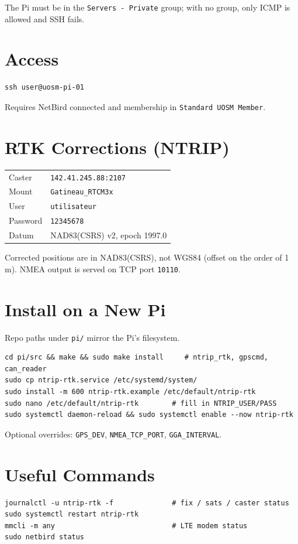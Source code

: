 \documentclass{article}
\begin{document}
\medskip
The Pi must be in the \texttt{Servers - Private} group; with no group, only ICMP is allowed and SSH fails.

\section{Access}
\begin{verbatim}
ssh user@uosm-pi-01
\end{verbatim}
Requires NetBird connected and membership in \texttt{Standard UOSM Member}.

\section{RTK Corrections (NTRIP)}
\begin{tabular}{@{}ll@{}}
\toprule
Caster    & \texttt{142.41.245.88:2107} \\
Mount     & \texttt{Gatineau\_RTCM3x} \\
User      & \texttt{utilisateur} \\
Password  & \texttt{12345678} \\
Datum     & NAD83(CSRS) v2, epoch 1997.0 \\
\bottomrule
\end{tabular}

\medskip
Corrected positions are in NAD83(CSRS), not WGS84 (offset on the order of 1\,m).
NMEA output is served on TCP port \texttt{10110}.

\section{Install on a New Pi}
Repo paths under \texttt{pi/} mirror the Pi's filesystem.
\begin{verbatim}
cd pi/src && make && sudo make install     # ntrip_rtk, gpscmd, can_reader
sudo cp ntrip-rtk.service /etc/systemd/system/
sudo install -m 600 ntrip-rtk.example /etc/default/ntrip-rtk
sudo nano /etc/default/ntrip-rtk        # fill in NTRIP_USER/PASS
sudo systemctl daemon-reload && sudo systemctl enable --now ntrip-rtk
\end{verbatim}
Optional overrides: \texttt{GPS\_DEV}, \texttt{NMEA\_TCP\_PORT}, \texttt{GGA\_INTERVAL}.

\section{Useful Commands}
\begin{verbatim}
journalctl -u ntrip-rtk -f              # fix / sats / caster status
sudo systemctl restart ntrip-rtk
mmcli -m any                            # LTE modem status
sudo netbird status
\end{verbatim}
\end{document}
